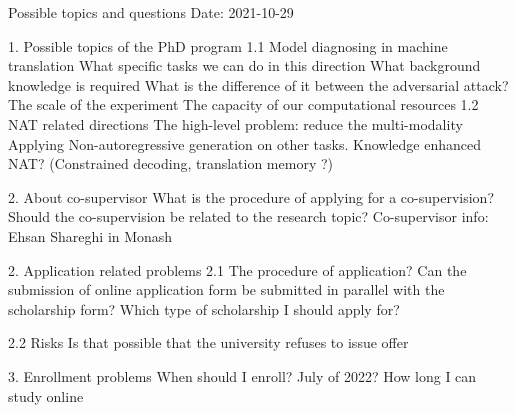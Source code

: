Possible topics and questions
Date: 2021-10-29

1. Possible topics of the PhD program
    1.1 Model diagnosing in machine translation
        What specific tasks we can do in this direction
        What background knowledge is required
		What is the difference of it between the adversarial attack? 
        The scale of the experiment
        The capacity of our computational resources
    1.2 NAT related directions
        The high-level problem: reduce the multi-modality
        Applying Non-autoregressive generation on other tasks.
        Knowledge enhanced NAT? (Constrained decoding, translation memory ?)
		

2. About co-supervisor
    What is the procedure of applying for a co-supervision?
Should the co-supervision be related to the research topic?
Co-supervisor info:
	Ehsan Shareghi in Monash

2. Application related problems
    2.1 The procedure of application?
        Can the submission of online application form be submitted in parallel with the scholarship form?
        Which type of scholarship I should apply for?
		
    2.2 Risks
        Is that possible that the university refuses to issue offer

3. Enrollment problems
    When should I enroll? July of 2022?
    How long I can study online
